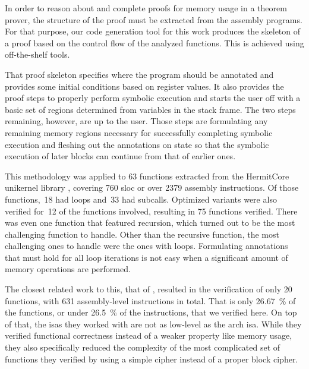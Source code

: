 In order to reason about and complete proofs for memory usage in a theorem prover, the structure of the proof must be extracted from the assembly programs.
For that purpose, our code generation tool for this work produces the skeleton of a proof based on the control flow of the analyzed functions.
This is achieved using off-the-shelf tools.

That proof skeleton specifies where the program should be annotated and provides some initial conditions based on register values.
It also provides the proof steps to properly perform symbolic execution and starts the user off with a basic set of regions determined from variables in the stack frame.
The two steps remaining, however, are up to the user.
Those steps are formulating any remaining memory regions necessary for successfully completing symbolic execution and fleshing out the annotations on state so that the symbolic execution of later blocks can continue from that of earlier ones.

This methodology was applied to \num{63} functions extracted from the HermitCore \autocite{lankes2016hermitcore} unikernel library \autocite{madhavapeddy2014unikernels}, covering \num{760} \ac{sloc} or over \num{2379} assembly instructions.
Of those functions,~\num{18} had loops and~\num{33} had subcalls.
Optimized variants were also verified for~\num{12} of the functions involved, resulting in \num{75} functions verified.
There was even one function that featured recursion, which turned out to be the most challenging function to handle.
Other than the recursive function, the most challenging ones to handle were the ones with loops.
Formulating annotations that must hold for all loop iterations is not easy when a significant amount of memory operations are performed.

The closest related work to this, that of \textcite{matthews2006verification}, resulted in the verification of only \num{20} functions, with \num{631} assembly-level instructions in total.
That is only \SI{26.67}{\percent} of the functions, or under \SI{26.5}{\percent} of the instructions, that we verified here.
On top of that, the \acp{isa} they worked with are not as low-level as the \gls{arch} \ac{isa}.
While they verified functional correctness instead of a weaker property like memory usage, they also specifically reduced the complexity of the most complicated set of functions they verified by using a simple  cipher instead of a proper block cipher.


